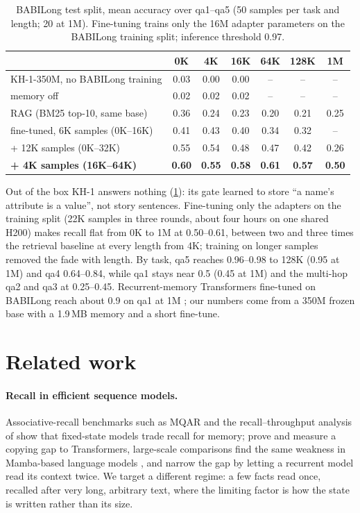 \documentclass[11pt]{article}
\newcommand{\KH}{KH-1}
\begin{document}
\begin{table}[t]
\centering
\small
\caption{BABILong test split, mean accuracy over qa1--qa5 (50 samples per task and length; 20 at 1M). Fine-tuning trains only the 16M adapter parameters on the BABILong training split; inference threshold 0.97.}
\label{tab:babilong}
\begin{tabular}{@{}lcccccc@{}}
\toprule
 & 0K & 4K & 16K & 64K & 128K & 1M \\
\midrule
\KH{}-350M, no BABILong training & 0.03 & 0.00 & 0.00 & -- & -- & -- \\
memory off & 0.02 & 0.02 & 0.02 & -- & -- & -- \\
RAG (BM25 top-10, same base) & 0.36 & 0.24 & 0.23 & 0.20 & 0.21 & 0.25 \\
fine-tuned, 6K samples (0K--16K) & 0.41 & 0.43 & 0.40 & 0.34 & 0.32 & -- \\
+ 12K samples (0K--32K) & 0.55 & 0.54 & 0.48 & 0.47 & 0.42 & 0.26 \\
\textbf{+ 4K samples (16K--64K)} & \textbf{0.60} & \textbf{0.55} & \textbf{0.58} & \textbf{0.61} & \textbf{0.57} & \textbf{0.50} \\
\bottomrule
\end{tabular}
\end{table}

Out of the box \KH{} answers nothing (\cref{tab:babilong}): its gate learned to store ``a name's attribute is a value'', not story sentences. Fine-tuning only the adapters on the training split (22K samples in three rounds, about four hours on one shared H200) makes recall flat from 0K to 1M at 0.50--0.61, between two and three times the retrieval baseline at every length from 4K; training on longer samples removed the fade with length. By task, qa5 reaches 0.96--0.98 to 128K (0.95 at 1M) and qa4 0.64--0.84, while qa1 stays near 0.5 (0.45 at 1M) and the multi-hop qa2 and qa3 at 0.25--0.45. Recurrent-memory Transformers fine-tuned on BABILong reach about 0.9 on qa1 at 1M \citep{babilong2024,armt2024}; our numbers come from a 350M frozen base with a 1.9\,MB memory and a short fine-tune.

\section{Related work}
\label{sec:related}
\paragraph{Recall in efficient sequence models.} Associative-recall benchmarks such as MQAR \citep{zoology2023} and the recall--throughput analysis of \citet{based2024} show that fixed-state models trade recall for memory; \citet{jelassi2024} prove and measure a copying gap to Transformers, large-scale comparisons find the same weakness in Mamba-based language models \citep{waleffe2024}, and \citet{jrt2024} narrow the gap by letting a recurrent model read its context twice. We target a different regime: a few facts read once, recalled after very long, arbitrary text, where the limiting factor is how the state is written rather than its size.
\end{document}
